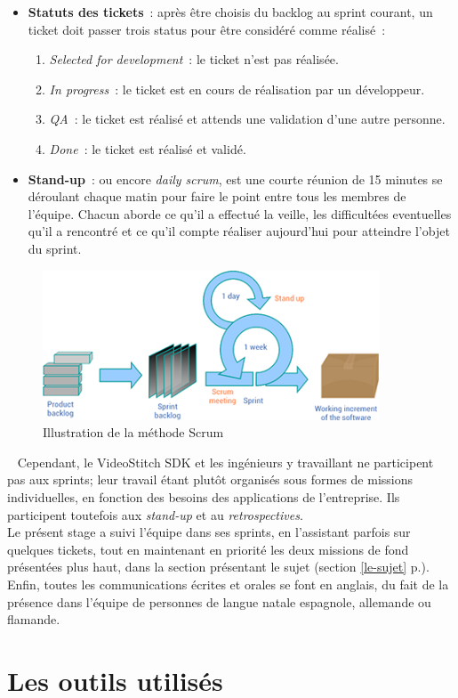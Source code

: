 \begin{itemize}
  \item \textbf{Statuts des tickets}~: après être choisis du backlog au sprint courant, 
  un ticket doit passer trois status pour être considéré comme réalisé~:
    \begin{enumerate}
      \item \textit{Selected for development}~: le ticket n'est pas réalisée.
      \item \textit{In progress}~: le ticket est en cours de réalisation par un développeur.
      \item \textit{QA}~: le ticket est réalisé et attends une validation d'une autre personne.
      \item \textit{Done}~: le ticket est réalisé et validé. 
    \end{enumerate}
  \item \textbf{Stand-up}~: \label{stand-up} ou encore \textit{daily scrum}, est une courte réunion de 15 minutes
	se déroulant chaque matin pour faire le point entre tous les membres de l'équipe.
	Chacun aborde ce qu'il a effectué la veille, les difficultées eventuelles qu'il
	a rencontré et ce qu'il compte réaliser aujourd'hui pour atteindre l'objet du sprint.
\end{itemize}
\begin{figure}
  \centering
  \includegraphics[width=10cm]{images/scrum-process.png}
  \caption{Illustration de la méthode Scrum\cite{scrum-process}}
\end{figure}
\ \newline
Cependant, le VideoStitch SDK et les ingénieurs y travaillant ne participent pas
aux sprints; leur travail étant plutôt organisés sous formes de missions individuelles,
en fonction des besoins des applications de l'entreprise. Ils participent toutefois 
aux \textit{stand-up} et au \textit{retrospectives}.\\
Le présent stage a suivi l'équipe dans ses sprints, en l'assistant parfois sur quelques
tickets, tout en maintenant en priorité les deux missions de fond présentées plus haut, dans 
la section présentant le sujet (section \ref{le-sujet} p.\pageref{le-sujet}).\\
\newline
Enfin, toutes les communications écrites et orales se font en anglais, du fait
de la présence dans l'équipe de personnes de langue natale espagnole, allemande ou flamande.

\section{Les outils utilisés}
